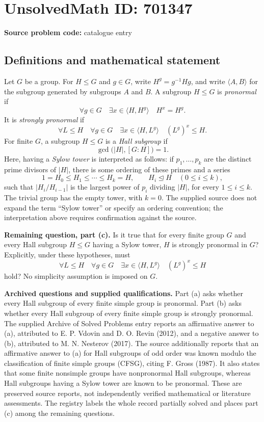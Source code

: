 \documentclass[11pt]{article}
\begin{document}
\section*{UnsolvedMath ID: 701347}
\textbf{Source problem code:} catalogue entry
\subsection{Definitions and mathematical statement}
Let \(G\) be a group. For \(H\leq G\) and \(g\in G\), write \(H^g=g^{-1}Hg\), and write \(\langle A,B\rangle\) for the subgroup generated by subgroups \(A\) and \(B\). A subgroup \(H\leq G\) is \emph{pronormal} if
\[
\forall g\in G\quad \exists x\in\langle H,H^g\rangle\quad H^x=H^g.
\]
It is \emph{strongly pronormal} if
\[
\forall L\leq H\quad\forall g\in G\quad
\exists x\in\langle H,L^g\rangle\quad (L^g)^x\leq H.
\]
For finite \(G\), a subgroup \(H\leq G\) is a \emph{Hall subgroup} if
\[
\gcd\bigl(|H|,[G:H]\bigr)=1.
\]
Here, having a \emph{Sylow tower} is interpreted as follows: if \(p_1,\ldots,p_k\) are the distinct prime divisors of \(|H|\), there is some ordering of these primes and a series
\[
1=H_0\leq H_1\leq\cdots\leq H_k=H,
\qquad H_i\trianglelefteq H\quad(0\leq i\leq k),
\]
such that \(|H_i/H_{i-1}|\) is the largest power of \(p_i\) dividing \(|H|\), for every \(1\leq i\leq k\). The trivial group has the empty tower, with \(k=0\). The supplied source does not expand the term ``Sylow tower'' or specify an ordering convention; the interpretation above requires confirmation against the source.

\textbf{Remaining question, part (c).} Is it true that for every finite group \(G\) and every Hall subgroup \(H\leq G\) having a Sylow tower, \(H\) is strongly pronormal in \(G\)? Explicitly, under these hypotheses, must
\[
\forall L\leq H\quad\forall g\in G\quad
\exists x\in\langle H,L^g\rangle\quad (L^g)^x\leq H
\]
hold? No simplicity assumption is imposed on \(G\).

\textbf{Archived questions and supplied qualifications.} Part (a) asks whether every Hall subgroup of every finite simple group is pronormal. Part (b) asks whether every Hall subgroup of every finite simple group is strongly pronormal. The supplied Archive of Solved Problems entry reports an affirmative answer to (a), attributed to E. P. Vdovin and D. O. Revin (2012), and a negative answer to (b), attributed to M. N. Nesterov (2017). The source additionally reports that an affirmative answer to (a) for Hall subgroups of odd order was known modulo the classification of finite simple groups (CFSG), citing F. Gross (1987). It also states that some finite nonsimple groups have nonpronormal Hall subgroups, whereas Hall subgroups having a Sylow tower are known to be pronormal. These are preserved source reports, not independently verified mathematical or literature assessments. The registry labels the whole record partially solved and places part (c) among the remaining questions.
\end{document}
